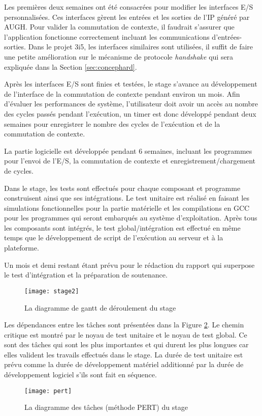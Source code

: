 Les premières deux semaines ont été consacrées pour modifier les interfaces E/S personnalisées. Ces interfaces
gèrent les entrées et les sorties de l'IP généré par AUGH. Pour valider la commutation de contexte,
il faudrait s'assurer que l'application fonctionne correctement incluant les communications d'entrées-sorties.
Dans le projet 3i5, les interfaces similaires sont utilisées, il suffit de faire une petite amélioration sur le mécanisme de protocole
\emph{handshake} qui sera expliquée dans la Section \ref{sec:concephard}.

Après les interfaces E/S sont finies et testées, le stage s'avance au développement de l'interface de la commutation
de contexte pendant environ un mois. Afin d'évaluer les performances de système, l'utilisateur doit avoir un accès au
nombre des cycles passés pendant l'exécution, un timer est donc développé pendant deux semaines pour enregistrer
le nombre des cycles de l'exécution et de la commutation de contexte.

La partie logicielle est développée pendant 6 semaines, incluant les programmes pour l'envoi de l'E/S, la commutation
de contexte et enregistrement/chargement de cycles. 

Dans le stage, les tests sont effectués pour chaque composant et programme construisent ainsi que ses intégrations. 
Le test unitaire est réalisé en faisant les simulations fonctionnelles pour la partie matérielle et les compilations en GCC
pour les programmes qui seront embarqués au système d'exploitation. Après tous les composants sont intégrés,
le test global/intégration est effectué en même temps que le développement de script de l'exécution au serveur
et à la plateforme. 

Un mois et demi restant étant prévu pour le rédaction du rapport qui superpose le test d'intégration et la préparation
de soutenance.

\begin{figure}[h]
	\centering
	\texttt{[image: stage2]}
	\caption{La diagramme de gantt de déroulement du stage}
	\label{fig:gantt}
	\vspace{-2mm}
\end{figure}

Les dépendances entre les tâches sont présentées dans la Figure \ref{fig:pert}. Le chemin critique est montré par le noyau
de test unitaire et le noyau de test global. Ce sont des tâches qui sont les plus importantes et qui durent les plus longues car
elles valident les travails effectués dans le stage. La durée de test unitaire est prévu comme la durée de développement
matériel additionné par la durée de développement logiciel s'ils sont fait en séquence.

\begin{figure}[h]
	\centering
	\texttt{[image: pert]}
	\caption{La diagramme des tâches (méthode PERT) du stage}
	\label{fig:pert}
	\vspace{-2mm}
\end{figure}

